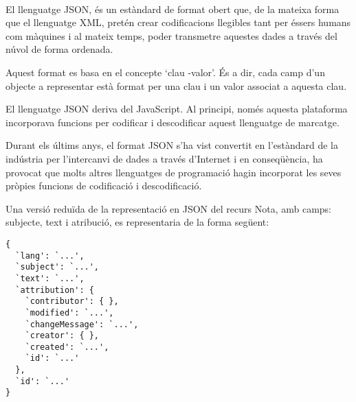         \paragraph{}
        El llenguatge \gls{JSON}, és un estàndard de format obert que, de la mateixa forma que el llenguatge XML, pretén crear codificacions llegibles tant per éssers humans com màquines i al mateix temps, poder transmetre aquestes dades a través del núvol de forma ordenada.

        Aquest format es basa en el concepte ‘clau -valor’. És a dir, cada camp d'un objecte a representar està format per una clau i un valor associat a aquesta clau.

        El llenguatge JSON deriva del JavaScript. Al principi, només aquesta plataforma incorporava funcions per codificar i descodificar aquest llenguatge de marcatge.

        Durant els últims anys, el format JSON s'ha vist convertit en l'estàndard de la indústria per l'intercanvi de dades a través d'Internet i en conseqüència, ha provocat que molts altres llenguatges de programació hagin incorporat les seves pròpies funcions de codificació i descodificació.

        Una versió reduïda de la representació en JSON del recurs Nota, amb camps: subjecte, text i atribució, es representaria de la forma següent:

        \begin{lstlisting}[style=rawOwn,caption={Representació bàsica en JSON d'una Nota}]
{
  `lang': `...',
  `subject': `...',
  `text': `...',
  `attribution': {
    `contributor': { },
    `modified': `...',
    `changeMessage': `...',
    `creator': { },
    `created': `...',
    `id': `...'
  },
  `id': `...'
}
        \end{lstlisting}

